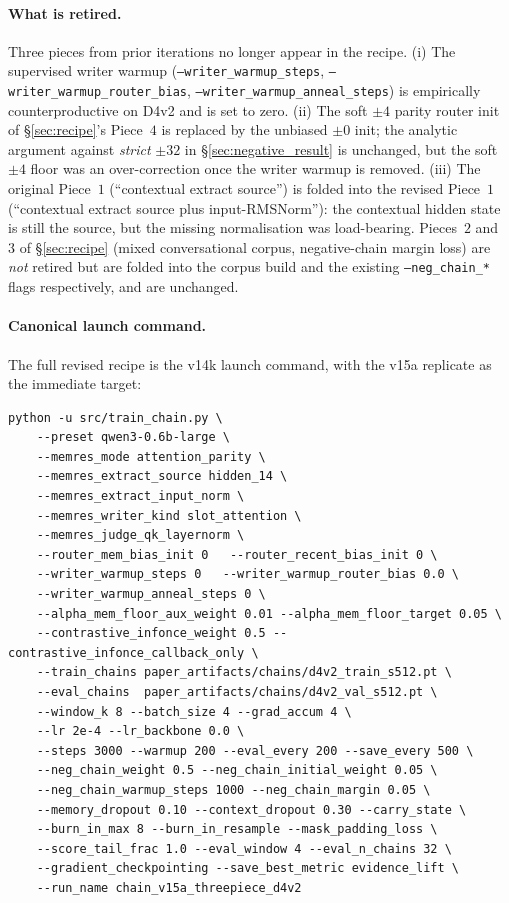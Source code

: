 \paragraph{What is retired.}
Three pieces from prior iterations no longer appear in the recipe.
(i) The supervised writer warmup
(\texttt{--writer\_warmup\_steps},
\texttt{--writer\_warmup\_router\_bias},
\texttt{--writer\_warmup\_anneal\_steps}) is empirically
counterproductive on D4v2 and is set to zero. (ii) The soft $\pm 4$
parity router init of \S\ref{sec:recipe}'s Piece~$4$ is replaced by
the unbiased $\pm 0$ init; the analytic argument against
\emph{strict} $\pm 32$ in \S\ref{sec:negative_result} is unchanged,
but the soft $\pm 4$ floor was an over-correction once the writer
warmup is removed. (iii) The original Piece~$1$
(``contextual extract source'') is folded into the revised Piece~$1$
(``contextual extract source plus input-RMSNorm''): the contextual
hidden state is still the source, but the missing normalisation was
load-bearing. Pieces~$2$ and~$3$ of \S\ref{sec:recipe}
(mixed conversational corpus, negative-chain margin loss) are
\emph{not} retired but are folded into the corpus build and the
existing \texttt{--neg\_chain\_*} flags respectively, and are
unchanged.

\paragraph{Canonical launch command.}
The full revised recipe is the v14k launch command, with the v15a
replicate as the immediate target:

{\small\begin{verbatim}
python -u src/train_chain.py \
    --preset qwen3-0.6b-large \
    --memres_mode attention_parity \
    --memres_extract_source hidden_14 \
    --memres_extract_input_norm \
    --memres_writer_kind slot_attention \
    --memres_judge_qk_layernorm \
    --router_mem_bias_init 0   --router_recent_bias_init 0 \
    --writer_warmup_steps 0   --writer_warmup_router_bias 0.0 \
    --writer_warmup_anneal_steps 0 \
    --alpha_mem_floor_aux_weight 0.01 --alpha_mem_floor_target 0.05 \
    --contrastive_infonce_weight 0.5 --contrastive_infonce_callback_only \
    --train_chains paper_artifacts/chains/d4v2_train_s512.pt \
    --eval_chains  paper_artifacts/chains/d4v2_val_s512.pt \
    --window_k 8 --batch_size 4 --grad_accum 4 \
    --lr 2e-4 --lr_backbone 0.0 \
    --steps 3000 --warmup 200 --eval_every 200 --save_every 500 \
    --neg_chain_weight 0.5 --neg_chain_initial_weight 0.05 \
    --neg_chain_warmup_steps 1000 --neg_chain_margin 0.05 \
    --memory_dropout 0.10 --context_dropout 0.30 --carry_state \
    --burn_in_max 8 --burn_in_resample --mask_padding_loss \
    --score_tail_frac 1.0 --eval_window 4 --eval_n_chains 32 \
    --gradient_checkpointing --save_best_metric evidence_lift \
    --run_name chain_v15a_threepiece_d4v2
\end{verbatim}}

